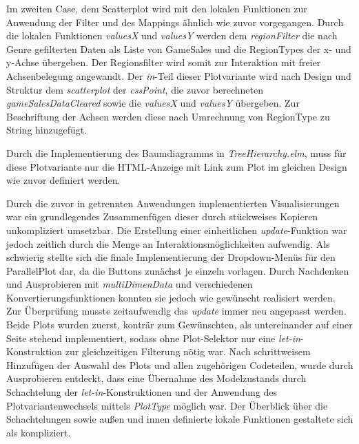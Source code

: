 \documentclass[usegeometry=true]{scrartcl}
\begin{document}
Im zweiten Case, dem Scatterplot wird mit den lokalen Funktionen zur Anwendung der Filter und des Mappings ähnlich wie zuvor vorgegangen.
Durch die lokalen Funktionen \textit{valuesX} und \textit{valuesY} werden dem \textit{regionFilter} die nach Genre gefilterten Daten 
als Liste von GameSales und die RegionTypes der x- und y-Achse übergeben.
Der Regionsfilter wird somit zur Interaktion mit freier Achsenbelegung angewandt.
Der \textit{in}-Teil dieser Plotvariante wird nach Design und Struktur dem \textit{scatterplot} der \textit{cssPoint}, die zuvor berechneten \textit{gameSalesDataCleared} sowie die \textit{valuesX} und \textit{valuesY} übergeben.
Zur Beschriftung der Achsen werden diese nach Umrechnung von RegionType zu String hinzugefügt.

Durch die Implementierung des Baumdiagramms in \textit{TreeHierarchy.elm}, 
muss für diese Plotvariante nur die HTML-Anzeige mit Link zum Plot im gleichen Design wie zuvor definiert werden.

Durch die zuvor in getrennten Anwendungen implementierten Visualisierungen war ein grundlegendes Zusammenfügen dieser 
durch stückweises Kopieren unkompliziert umsetzbar.
Die Erstellung einer einheitlichen \textit{update}-Funktion war jedoch zeitlich durch die Menge an Interaktionsmöglichkeiten aufwendig.
Als schwierig stellte sich die finale Implementierung der Dropdown-Menüs für den ParallelPlot dar, da die Buttons zunächst je einzeln vorlagen. 
Durch Nachdenken und Ausprobieren mit \textit{multiDimenData} und verschiedenen Konvertierungsfunktionen konnten sie jedoch wie gewünscht realisiert werden.
Zur Überprüfung musste zeitaufwendig das \textit{update} immer neu angepasst werden.
Beide Plots wurden zuerst, konträr zum Gewünschten, als untereinander auf einer Seite stehend implementiert, 
sodass ohne Plot-Selektor nur eine \textit{let-in}-Konstruktion zur gleichzeitigen Filterung nötig war.
Nach schrittweisem Hinzufügen der Auswahl des Plots und allen zugehörigen Codeteilen, wurde durch Ausprobieren entdeckt, 
dass eine Übernahme des Modelzustands durch Schachtelung der \textit{let-in}-Konstruktionen 
und der Anwendung des Plotvariantenwechsels mittels \textit{PlotType} möglich war. 
Der Überblick über die Schachtelungen sowie außen und innen definierte lokale Funktionen gestaltete sich als kompliziert.

\end{document}
